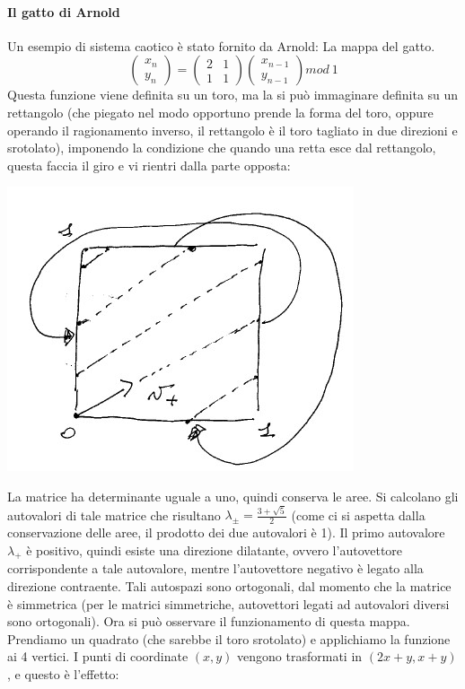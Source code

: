 \documentclass[12pt]{article}
\newcommand{\la}{\lambda}
\begin{document}
\paragraph*{Il gatto di Arnold \\}
Un esempio di sistema caotico è stato fornito da Arnold: La mappa del gatto. \\
\begin{equation}
	\begin{pmatrix}
	x_n \\
	y_n
	\end{pmatrix} = \begin{pmatrix}
	2 & 1 \\
	1 & 1
	\end{pmatrix} \begin{pmatrix}
	x_{n-1} \\
	y_{n-1}
	\end{pmatrix} mod \ 1
\end{equation}
Questa funzione viene definita su un toro, ma la si può immaginare definita su un rettangolo (che piegato nel modo opportuno prende la forma del toro, oppure operando il ragionamento inverso, il rettangolo è il toro tagliato in due direzioni e srotolato), imponendo la condizione che quando una retta esce dal rettangolo, questa faccia il giro e vi rientri dalla parte opposta:
\begin{center}
\includegraphics[scale=.8]{Taglio del toro}
\end{center}
La matrice ha determinante uguale a uno, quindi conserva le aree. Si calcolano gli autovalori di tale matrice che risultano $\la_{\pm} = \frac{3+\sqrt{5}}{2}$ (come ci si aspetta dalla conservazione delle aree, il prodotto dei due autovalori è 1). Il primo autovalore $\la_+$ è positivo, quindi esiste una direzione dilatante, ovvero l'autovettore corrispondente a tale autovalore, mentre l'autovettore negativo è legato alla direzione contraente. Tali autospazi sono ortogonali, dal momento che la matrice è simmetrica (per le matrici simmetriche, autovettori legati ad autovalori diversi sono ortogonali). Ora si può osservare il funzionamento di questa mappa. Prendiamo un quadrato (che sarebbe il toro srotolato) e applichiamo la funzione ai 4 vertici. I punti di coordinate $(x,y)$ vengono trasformati in $(2x+y,x+y)$, e questo è l'effetto: 
\end{document}
